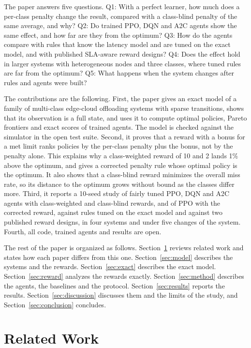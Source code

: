 \documentclass[journal]{IEEEtran}
\begin{document}
The paper answers five questions.
Q1: With a perfect learner, how much does a per-class penalty change the result, compared with a class-blind penalty of the same average, and why?
Q2: Do trained PPO, DQN and A2C agents show the same effect, and how far are they from the optimum?
Q3: How do the agents compare with rules that know the latency model and are tuned on the exact model, and with published SLA-aware reward designs?
Q4: Does the effect hold in larger systems with heterogeneous nodes and three classes, where tuned rules are far from the optimum?
Q5: What happens when the system changes after rules and agents were built?

The contributions are the following. First, the paper gives an exact model of a family of multi-class edge-cloud offloading systems with sparse transitions, shows that its observation is a full state, and uses it to compute optimal policies, Pareto frontiers and exact scores of trained agents. The model is checked against the simulator in the open test suite. Second, it proves that a reward with a bonus for a met limit ranks policies by the per-class penalty plus the bonus, not by the penalty alone. This explains why a class-weighted reward of 10 and 2 lands 1\% above the optimum, and gives a corrected penalty rule whose optimal policy is the optimum. It also shows that a class-blind reward minimizes the overall miss rate, so its distance to the optimum grows without bound as the classes differ more. Third, it reports a 10-seed study of fairly tuned PPO, DQN and A2C agents with class-weighted and class-blind rewards, and of PPO with the corrected reward, against rules tuned on the exact model and against two published reward designs, in four systems and under five changes of the system. Fourth, all code, trained agents and results are open.

The rest of the paper is organized as follows. Section~\ref{sec:related} reviews related work and states how each paper differs from this one. Section~\ref{sec:model} describes the systems and the rewards. Section~\ref{sec:exact} describes the exact model. Section~\ref{sec:reward} analyzes the rewards exactly. Section~\ref{sec:method} describes the agents, the baselines and the protocol. Section~\ref{sec:results} reports the results. Section~\ref{sec:discussion} discusses them and the limits of the study, and Section~\ref{sec:conclusion} concludes.

\section{Related Work}
\label{sec:related}
\end{document}
